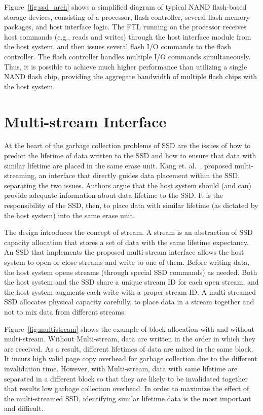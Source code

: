 Figure~\ref{fig:ssd_arch} shows a simplified diagram of typical NAND flash-based storage
devices, consisting of a processor, flash controller, several flash memory packages, and
host interface logic. The FTL running on the processor receives host commands (e.g., reads
and writes) through the host interface module from the host system, and then issues several
flash I/O commands to the flash controller. The flash controller handles multiple I/O commands
simultaneously. Thus, it is possible to achieve much higher performance than utilizing
a single NAND flash chip, providing the aggregate bandwidth of multiple flash chips
with the host system.

\section{Multi-stream Interface}
At the heart of the garbage collection problems of SSD are the issues of
how to predict the lifetime of data written to the SSD and
how to ensure that data with similar lifetime are placed in
the same erase unit. Kang et. al.~\cite{MultiStream}, proposed multi-streaming,
an interface that directly guides data placement within
the SSD, separating the two issues. Authors argue that the
host system should (and can) provide adequate information
about data lifetime to the SSD. It is the responsibility
of the SSD, then, to place data with similar lifetime (as
dictated by the host system) into the same erase unit.

The design introduces the concept of stream. A stream
is an abstraction of SSD capacity allocation that stores a
set of data with the same lifetime expectancy. An SSD
that implements the proposed multi-stream interface allows
the host system to open or close streams and write to
one of them. Before writing data, the host system opens
streams (through special SSD commands) as needed.
Both the host system and the SSD share a unique stream
ID for each open stream, and the host system augments
each write with a proper stream ID. A multi-streamed
SSD allocates physical capacity carefully, to place data
in a stream together and not to mix data from different
streams.


Figure~\ref{fig:multistream} shows the example of block allocation with and without
multi-stream. Without Multi-stream, data are written in the order in which 
they are received. As a result, different lifetimes of data are mixed in the same block.
It incurs high valid page copy overhead for garbage collection due to the different 
invalidation time.
However, with Multi-stream, data with same lifetime are separated in a different block
so that they are likely to be invalidated together that results low garbage collection overhead.
In order to maximize the effect of the multi-streamed SSD, identifying similar lifetime data
is the most important and difficult.


